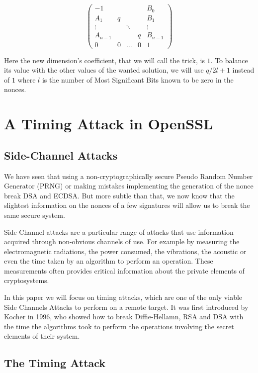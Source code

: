 \documentclass[a4paper,11pt]{article}
\begin{document}
$$
\begin{pmatrix}
-1 & & & & B_0\\
A_1 & q & & & B_1 \\
\vdots & & \ddots & &\vdots \\
A_{n-1} & & & q & B_{n-1}\\
0 & 0 & \hdots & 0 & 1
\end{pmatrix}
$$

Here the new dimension's coefficient, that we will call the trick, is $1$. To balance its value with the other values of the wanted solution, we will use $q / 2{l+1}$ instead of $1$ where $l$ is the number of Most Significant Bits known to be zero in the nonces.


\section{A Timing Attack in OpenSSL}

\subsection{Side-Channel Attacks}

We have seen that using a non-cryptographically secure Pseudo Random Number Generator (PRNG) or making mistakes implementing the generation of the nonce break DSA and ECDSA. But more subtle than that, we now know that the slightest information on the nonces of a few signatures will allow us to break the same secure system.

Side-Channel attacks are a particular range of attacks that use information acquired through non-obvious channels of use. For example by measuring the electromagnetic radiations, the power consumed, the vibrations, the acoustic or even the time taken by an algorithm to perform an operation. These measurements often provides critical information about the private elements of cryptosystems.

In this paper we will focus on timing attacks, which are one of the only viable Side Channels Attacks to perform on a remote target. It was first introduced by Kocher in 1996\cite{Kocher}, who showed how to break Diffie-Hellamn, RSA and DSA with the time the algorithms took to perform the operations involving the secret elements of their system.

\subsection{The Timing Attack}
\end{document}
